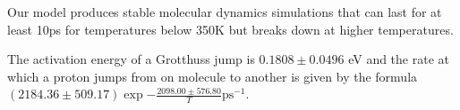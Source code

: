 \documentclass[reprint,]{revtex4-2}
\begin{document}
Our model produces stable molecular dynamics simulations that can last for at least 10ps for temperatures below 350K but breaks down at higher temperatures.

The activation energy of a Grotthuss jump is $0.1808 \pm 0.0496$ eV and the rate at which a proton jumps from on molecule to another is given by the formula $(2184.36 \pm 509.17)\exp{-\frac{2098.00 \pm 576.80}{T}} \text{ps}^{-1}$.



	
\end{document}
